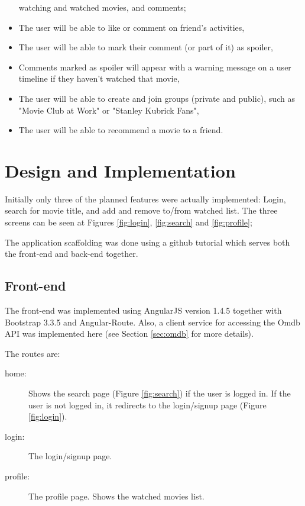 \begin{itemize}
    watching and watched movies, and comments;
  \item The user will be able to like or comment on friend's activities,
  \item The user will be able to mark their comment (or part of it) as spoiler,
  \item Comments marked as spoiler will appear with a warning message on a user
    timeline if they haven't watched that movie,
  \item The user will be able to create and join groups (private and public),
    such as "Movie Club at Work" or "Stanley Kubrick Fans",
  \item The user will be able to recommend a movie to a friend.
\end{itemize}

\section{Design and Implementation}

Initially only three of the planned features were actually implemented: Login,
search for movie title, and add and remove to/from watched list. The three
screens can be seen at Figures \ref{fig:login}, \ref{fig:search} and
\ref{fig:profile};

The application scaffolding was done using a github tutorial \cite{githubtuto}
which serves both the front-end and back-end together.

\subsection{Front-end}

The front-end was implemented using AngularJS version 1.4.5 together with
Bootstrap 3.3.5 and Angular-Route. Also, a client service for accessing the
Omdb API was implemented here (see Section \ref{sec:omdb} for more details).

The routes are:

\begin{description}
  \item[home:] Shows the search page (Figure \ref{fig:search}) if the user is
    logged in. If the user is not logged in, it redirects to the login/signup
    page (Figure \ref{fig:login}).
  \item[login:] The login/signup page.
  \item[profile:] The profile page. Shows the watched movies list.
\end{description}

